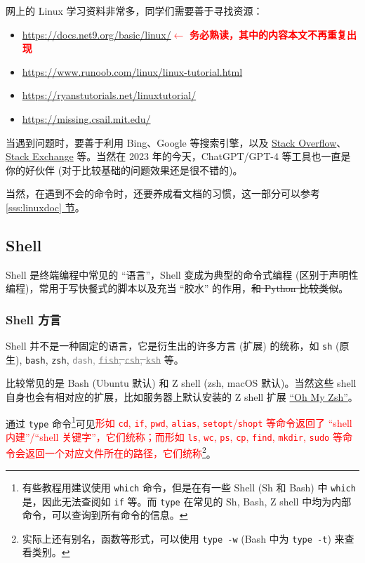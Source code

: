 \documentclass{article}
\begin{document}
	网上的 Linux 学习资料非常多，同学们需要善于寻找资源：

	\begin{itemize}
		\itemsep0pt
		\item \url{https://docs.net9.org/basic/linux/}\quad\textcolor{red}{$\gets$ \textbf{务必熟读，其中的内容本文不再重复出现}}
		\item \url{https://www.runoob.com/linux/linux-tutorial.html}
		\item \url{https://ryanstutorials.net/linuxtutorial/}
		\item \url{https://missing.csail.mit.edu/}
	\end{itemize}

	当遇到问题时，要善于利用 Bing、Google 等搜索引擎，以及 \href{https://stackoverflow.com/}{Stack Overflow}、\href{https://stackexchange.com/}{Stack Exchange} 等。当然在 2023 年的今天，ChatGPT/GPT-4 等工具也一直是你的好伙伴 (对于比较基础的问题效果还是很不错的)。

	当然，在遇到不会的命令时，还要养成看文档的习惯，这一部分可以参考 \hyperref[sss:linuxdoc]{\ref*{sss:linuxdoc} 节}。

	\subsection{Shell}

	Shell 是终端编程中常见的 ``语言''，Shell 变成为典型的命令式编程 (区别于声明性编程)，常用于写快餐式的脚本以及充当 ``胶水'' 的作用，\sout{和 Python 比较类似}。

	\subsubsection{Shell 方言}

	Shell 并不是一种固定的语言，它是衍生出的许多方言 (扩展) 的统称，如 \texttt{sh} (原生), \texttt{bash}, \texttt{zsh}, \textcolor{gray}{\texttt{dash}, \sout{\texttt{fish}, \texttt{csh}, \texttt{ksh}}} 等。

	比较常见的是 Bash (Ubuntu 默认) 和 Z shell (zsh, macOS 默认)。当然这些 shell 自身也会有相对应的扩展，比如服务器上默认安装的 Z shell 扩展 \href{https://ohmyz.sh/}{``Oh My Zsh''}。

	通过 \texttt{type} 命令\footnote{有些教程用建议使用 \texttt{which} 命令，但是在有一些 Shell (Sh 和 Bash) 中 \texttt{which} 是，因此无法查阅如 \texttt{if} 等。而 \texttt{type} 在常见的 Sh, Bash, Z shell 中均为内部命令，可以查询到所有命令的信息。}可见\textcolor{red}{形如 \texttt{cd}, \texttt{if}, \texttt{pwd}, \texttt{alias}, \texttt{setopt}/\texttt{shopt} 等命令返回了 ``shell 内建''/``shell 关键字''，它们统称；而形如 \texttt{ls}, \texttt{wc}, \texttt{ps}, \texttt{cp}, \texttt{find}, \texttt{mkdir}, \texttt{sudo} 等命令会返回一个对应文件所在的路径，它们统称}\footnote{实际上还有别名，函数等形式，可以使用 \texttt{type -w} (Bash 中为 \texttt{type -t}) 来查看类别。}。%
\end{document}
